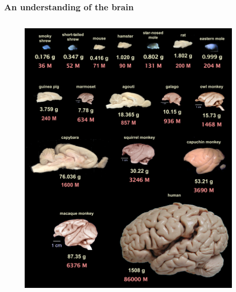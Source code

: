 \begin{frame}[c]
  \frametitle{An understanding of the brain}
  \begin{columns}
    \begin{column}{0.5\textwidth}
      \begin{figure}[h]
        \centering
        \includegraphics[width=\textwidth]{99_images/brain-sizes.jpg}
      \end{figure}
    \end{column}
    \begin{column}{0.5\textwidth}
      \begin{itemize}
      \end{itemize}
    \end{column}
  \end{columns}
  \vspace{0.2cm}
\end{frame}
